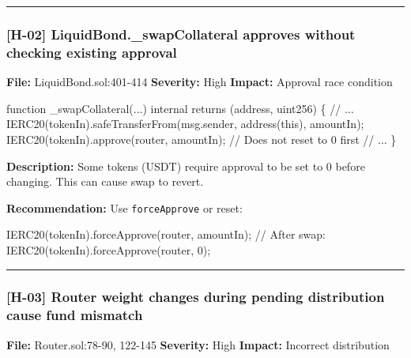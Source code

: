 \documentclass[
]{article}
\newenvironment{Shaded}{}{}
\newcommand{\NormalTok}[1]{#1}
\begin{document}
\begin{center}\rule{0.5\linewidth}{0.5pt}\end{center}

\subsubsection{{[}H-02{]} LiquidBond.\_swapCollateral approves without
checking existing
approval}\label{h-02-liquidbond_swapcollateral-approves-without-checking-existing-approval}

\textbf{File:} LiquidBond.sol:401-414 \textbf{Severity:} High
\textbf{Impact:} Approval race condition

\begin{Shaded}
\begin{Highlighting}[]
\NormalTok{function \_swapCollateral(...) internal returns (address, uint256) \{}
\NormalTok{    // ...}
\NormalTok{    IERC20(tokenIn).safeTransferFrom(msg.sender, address(this), amountIn);}
\NormalTok{    IERC20(tokenIn).approve(router, amountIn);  // Does not reset to 0 first}
\NormalTok{    // ...}
\NormalTok{\}}
\end{Highlighting}
\end{Shaded}

\textbf{Description:} Some tokens (USDT) require approval to be set to 0
before changing. This can cause swap to revert.

\textbf{Recommendation:} Use \texttt{forceApprove} or reset:

\begin{Shaded}
\begin{Highlighting}[]
\NormalTok{IERC20(tokenIn).forceApprove(router, amountIn);}
\NormalTok{// After swap:}
\NormalTok{IERC20(tokenIn).forceApprove(router, 0);}
\end{Highlighting}
\end{Shaded}

\begin{center}\rule{0.5\linewidth}{0.5pt}\end{center}

\subsubsection{{[}H-03{]} Router weight changes during pending
distribution cause fund
mismatch}\label{h-03-router-weight-changes-during-pending-distribution-cause-fund-mismatch}

\textbf{File:} Router.sol:78-90, 122-145 \textbf{Severity:} High
\textbf{Impact:} Incorrect distribution
\end{document}
